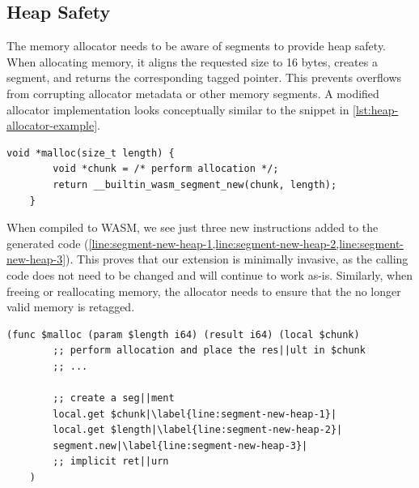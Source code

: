 \subsection{Heap Safety}
\label{subsec:heap-safety}

The memory allocator needs to be aware of segments to provide heap safety.
When allocating memory, it aligns the requested size to 16 bytes, creates a segment, and returns the corresponding tagged pointer.
This prevents overflows from corrupting allocator metadata or other memory segments.
A modified allocator implementation looks conceptually similar to the snippet in \cref{lst:heap-allocator-example}.

\begin{lstfloat}
    \begin{lstlisting}[frame=h,style=customc,
        label={lst:heap-allocator-example-inner}]
    void *malloc(size_t length) {
        void *chunk = /* perform allocation */;
        return __builtin_wasm_segment_new(chunk, length);
    }
    \end{lstlisting}
    \caption{Example of a malloc implementation utilizing the memory safety extension.}
    \label{lst:heap-allocator-example}
\end{lstfloat}

\noindent
When compiled to \ac{WASM}, we see just three new instructions added to the generated code (\cref{line:segment-new-heap-1,line:segment-new-heap-2,line:segment-new-heap-3}).
This proves that our extension is minimally invasive, as the calling code does not need to be changed and will continue to work as-is.
Similarly, when freeing or reallocating memory, the allocator needs to ensure that the no longer valid memory is retagged.

\begin{lstfloat}
    \begin{lstlisting}[frame=h,style=customwasm,
        label={lst:wasm-allocator-example-inner},escapechar=|]
    (func $malloc (param $length i64) (result i64) (local $chunk)
        ;; perform allocation and place the res||ult in $chunk
        ;; ...

        ;; create a seg||ment
        local.get $chunk|\label{line:segment-new-heap-1}|
        local.get $length|\label{line:segment-new-heap-2}|
        segment.new|\label{line:segment-new-heap-3}|
        ;; implicit ret||urn
    )
    \end{lstlisting}
    \caption{Generated \ac{WASM} for code from \cref{lst:heap-allocator-example}.}
    \label{lst:wasm-allocator-example}
\end{lstfloat}

